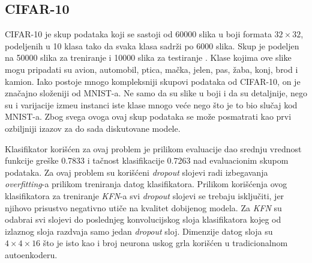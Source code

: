 \documentclass{article}
\begin{document}
	\subsection{CIFAR-10}
	\label{cifar10-section}
	
	CIFAR-10 je skup podataka koji se sastoji od 60000 slika u boji formata $32 \times 32$, podeljenih u 10 klasa tako da svaka klasa sadr\v zi po 6000 slika. 
	Skup je podeljen na 50000 slika za treniranje i 10000 slika za testiranje \cite{cifar10}. 
	Klase kojima ove slike mogu pripadati su avion, automobil, ptica, ma\v cka, jelen, pas, \v zaba, konj, brod i kamion.
	Iako postoje mnogo kompleksniji skupovi podataka od CIFAR-10, on je zna\v cajno slo\v zeniji od MNIST-a.
	Ne samo da su slike u boji i da su detaljnije, nego su i varijacije izme\dj u instanci iste klase mnogo ve\'ce nego \v sto je to bio slu\v caj kod MNIST-a.
	Zbog svega ovoga ovaj skup podataka se mo\v ze posmatrati kao prvi ozbiljniji izazov za do sada diskutovane modele.
	
	Klasifikator kori\v s\'cen za ovaj problem je prilikom evaluacije dao srednju vrednost funkcije gre\v ske 0.7833 i ta\v cnost klasifikacije 0.7263 nad evaluacionim skupom podataka.
	Za ovaj problem su kori\v s\'ceni \emph{dropout} slojevi radi izbegavanja \emph{overfitting}-a prilikom treniranja datog klasifikatora.
	Prilikom kori\v s\'cenja ovog klasifikatora za treniranje \emph{KFN}-a svi \emph{dropout} slojevi se trebaju isklju\v citi, jer njihovo prisustvo negativno uti\v ce na kvalitet dobijenog modela.
	Za \emph{KFN} su odabrai svi slojevi do poslednjeg konvolucijskog sloja klasifikatora kojeg od izlaznog sloja razdvaja samo jedan \emph{dropout} sloj.
	Dimenzije datog sloja su $4 \times 4 \times 16$ \v sto je isto kao i broj neurona uskog grla kori\v s\'cen u tradicionalnom autoenkoderu.
	
\end{document}
